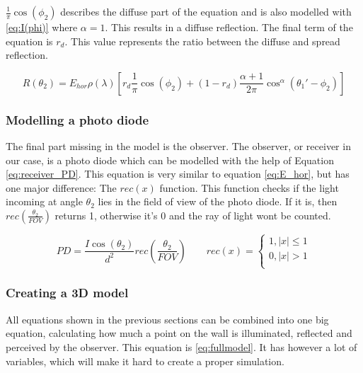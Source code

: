 $\frac{1}{\pi}\cos(\phi_2)$ describes the diffuse part of the equation and is also modelled with \ref{eq:I(phi)} where $\alpha = 1$. This results in a diffuse reflection. The final term of the equation is $r_d$. This value represents the ratio between the diffuse and spread reflection.

\begin{equation}
\label{eq:Reflection}
R(\theta_2) = E_{hor}\rho(\lambda)\left[ r_{d} \frac{1}{\pi}\cos(\phi_2)+ (1-r_{d})\frac{\alpha+1}{2\pi}\cos^\alpha(\theta_1'-\phi_2) \right]
\end{equation}

\subsubsection{Modelling a photo diode}
The final part missing in the model is the observer. The observer, or receiver in our case, is a photo diode which can be modelled with the help of Equation \ref{eq:receiver_PD}. This equation is very similar to equation \ref{eq:E_hor}, but has one major difference: The $rec(x)$ function. This function checks if the light incoming at angle $\theta_2$ lies in the field of view of the photo diode. If it is, then $rec \left(\frac{\theta_2}{FOV}\right)$ returns 1, otherwise it's 0 and the ray of light wont be counted.

\begin{equation}
	\label{eq:receiver_PD}
	PD = \frac{I\cos(\theta_2)}{d^2} rec \left(\frac{\theta_2}{FOV}\right)
	\qquad
	rec(x) = 
		\begin{cases}
		1, |x|\leq 1 \\
		0, |x| > 1 \\
		\end{cases}
\end{equation}

\subsubsection{Creating a 3D model}
All equations shown in the previous sections can be combined into one big equation, calculating how much a point on the wall is illuminated, reflected and perceived by the observer. This equation is \ref{eq:fullmodel}. It has however a lot of variables, which will make it hard to create a proper simulation. 

